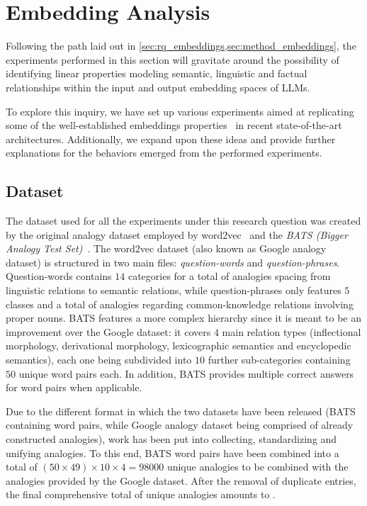 \section{Embedding Analysis}

Following the path laid out in \cref{sec:rq_embeddings,sec:method_embeddings}, the experiments performed in this section will gravitate around the possibility of identifying linear properties modeling semantic, linguistic and factual relationships within the input and output embedding spaces of LLMs.

To explore this inquiry, we have set up various experiments aimed at replicating some of the well-established embeddings properties~\cite{mikolov2013} in recent state-of-the-art architectures.
Additionally, we expand upon these ideas and provide further explanations for the behaviors emerged from the performed experiments.

\subsection{Dataset}

The dataset used for all the experiments under this research question was created by  the original analogy dataset employed by word2vec~\cite{mikolov2013} and the \emph{BATS (Bigger Analogy Test Set)}~\cite{drozd2016}.
The word2vec dataset (also known as Google analogy dataset) is structured in two main files: \emph{question-words} and \emph{question-phrases}.
Question-words contains $14$ categories for a total of  analogies spacing from linguistic relations to semantic relations, while question-phrases only features $5$ classes and a total of  analogies regarding common-knowledge relations involving proper nouns.
BATS features a more complex hierarchy since it is meant to be an improvement over the Google dataset: it covers $4$ main relation types (inflectional morphology, derivational morphology, lexicographic semantics and encyclopedic semantics), each one being subdivided into $10$ further sub-categories containing $50$ unique word pairs each.
In addition, BATS provides multiple correct answers for word pairs when applicable. 

Due to the different format in which the two datasets have been released (BATS containing word pairs, while Google analogy dataset being comprised of already constructed analogies),  work has been put into collecting, standardizing and unifying analogies.
To this end, BATS word pairs have been combined into a total of $(50 \times 49) \times 10 \times 4 = 98000$ unique analogies to be combined with the  analogies provided by the Google dataset.
After the removal of duplicate entries, the final comprehensive total of unique analogies amounts to .

